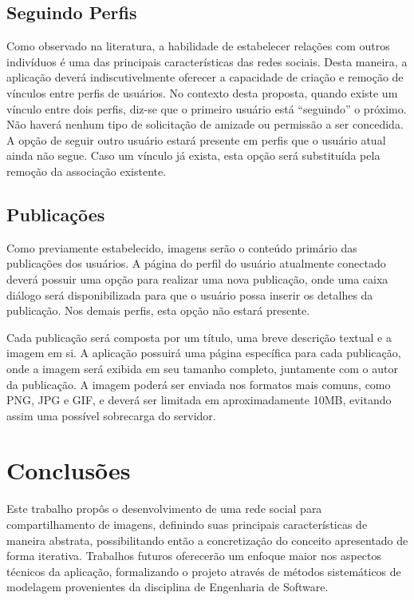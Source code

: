 \documentclass[12pt]{article}
\begin{document}
\subsection{Seguindo Perfis} \label{sub:following}

Como observado na literatura, a habilidade de estabelecer relações com outros indivíduos é uma das principais características das redes sociais. Desta maneira, a aplicação deverá indiscutivelmente oferecer a capacidade de criação e remoção de vínculos entre perfis de usuários. No contexto desta proposta, quando existe um vínculo entre dois perfis, diz-se que o primeiro usuário está ``seguindo'' o próximo. Não haverá nenhum tipo de solicitação de amizade ou permissão a ser concedida. A opção de seguir outro usuário estará presente em perfis que o usuário atual ainda não segue. Caso um vínculo já exista, esta opção será substituída pela remoção da associação existente.

\subsection{Publicações} \label{sub:publications}

Como previamente estabelecido, imagens serão o conteúdo primário das publicações dos usuários. A página do perfil do usuário atualmente conectado deverá possuir uma opção para realizar uma nova publicação, onde uma caixa diálogo será disponibilizada para que o usuário possa inserir os detalhes da publicação. Nos demais perfis, esta opção não estará presente.

Cada publicação será composta por um título, uma breve descrição textual e a imagem em si. A aplicação possuirá uma página específica para cada publicação, onde a imagem será exibida em seu tamanho completo, juntamente com o autor da publicação. A imagem poderá ser enviada nos formatos mais comuns, como PNG, JPG e GIF, e deverá ser limitada em aproximadamente 10MB, evitando assim uma possível sobrecarga do servidor.

\section{Conclusões} \label{sec:conclusions}

Este trabalho propôs o desenvolvimento de uma rede social para compartilhamento de imagens, definindo suas principais características de maneira abstrata, possibilitando então a concretização do conceito apresentado de forma iterativa. Trabalhos futuros oferecerão um enfoque maior nos aspectos técnicos da aplicação, formalizando o projeto através de métodos sistemáticos de modelagem provenientes da disciplina de Engenharia de Software.



\end{document}
